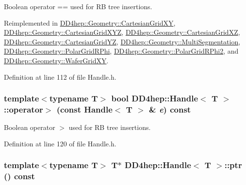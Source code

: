 Boolean operator == used for RB tree insertions. 

Reimplemented in \hyperlink{class_d_d4hep_1_1_geometry_1_1_cartesian_grid_x_y_af5cf0fdf544e007c8ed2eba569e1f61c}{DD4hep::Geometry::CartesianGridXY}, \hyperlink{class_d_d4hep_1_1_geometry_1_1_cartesian_grid_x_y_z_a35dac1689f0207c26e105c88e4529c9f}{DD4hep::Geometry::CartesianGridXYZ}, \hyperlink{class_d_d4hep_1_1_geometry_1_1_cartesian_grid_x_z_a6ebac42f6146d34bc9e83729e4bf279b}{DD4hep::Geometry::CartesianGridXZ}, \hyperlink{class_d_d4hep_1_1_geometry_1_1_cartesian_grid_y_z_a31f625c0056287ae2d993317ed3c661e}{DD4hep::Geometry::CartesianGridYZ}, \hyperlink{class_d_d4hep_1_1_geometry_1_1_multi_segmentation_a4c49fe036eda4b83a03ae28bd2592b6f}{DD4hep::Geometry::MultiSegmentation}, \hyperlink{class_d_d4hep_1_1_geometry_1_1_polar_grid_r_phi_ab90c2c089a725998035253e56ecfd0a3}{DD4hep::Geometry::PolarGridRPhi}, \hyperlink{class_d_d4hep_1_1_geometry_1_1_polar_grid_r_phi2_a06055e1c6d889eee992da2a8b51ba651}{DD4hep::Geometry::PolarGridRPhi2}, and \hyperlink{class_d_d4hep_1_1_geometry_1_1_wafer_grid_x_y_aab6b6ac50d9ce1f24ef7c6e0cb645ab1}{DD4hep::Geometry::WaferGridXY}.

Definition at line 112 of file Handle.h.\hypertarget{class_d_d4hep_1_1_handle_a31b4a56e1f449b035e07a38ffd9b7d5a}{
\subsubsection[{operator$>$}]{\setlength{\rightskip}{0pt plus 5cm}template$<$typename T$>$ bool {\bf DD4hep::Handle}$<$ {\bf T} $>$::operator$>$ (const {\bf Handle}$<$ {\bf T} $>$ \& {\em e}) const}}
\label{class_d_d4hep_1_1_handle_a31b4a56e1f449b035e07a38ffd9b7d5a}


Boolean operator $>$ used for RB tree insertions. 

Definition at line 120 of file Handle.h.\hypertarget{class_d_d4hep_1_1_handle_a51a7d12a15a2a18977a0036bc6435cc8}{
\subsubsection[{ptr}]{\setlength{\rightskip}{0pt plus 5cm}template$<$typename T$>$ {\bf T}$\ast$ {\bf DD4hep::Handle}$<$ {\bf T} $>$::ptr () const}}
\label{class_d_d4hep_1_1_handle_a51a7d12a15a2a18977a0036bc6435cc8}


